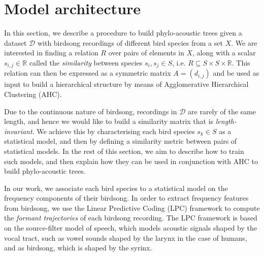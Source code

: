 \documentclass[pdftex,11pt,a4paper]{article}
\theoremstyle{definition}
\theoremstyle{remark}
\begin{document}
\section{Model architecture}
\label{section_model}
In this section, we describe a procedure to build phylo-acoustic trees given a dataset $\mathcal{D}$ with birdsong recordings of different bird species from a set $X$. We are interested in finding a relation $R$ over pairs of elements in $X$, along with a scalar $s_{i, j} \in \mathbb{R}$ called the \emph{similarity} between species $s_i, s_j \in S$, i.e. $R \subseteq S \times S \times \mathbb{R}$. This relation can then be expressed as a symmetric matrix $A = (d_{i,j})$ and be used as input to build a hierarchical structure by means of Agglomerative Hierarchical Clustering (AHC). 
\par Due to the continuous nature of birdsong, recordings in $\mathcal{D}$ are rarely of the same length, and hence we would like to build a similarity matrix that is \emph{length-invariant}. We achieve this by characterising each bird species $s_k \in S$ as a statistical model, and then by defining a similarity metric between pairs of statistical models. In the rest of this section, we aim to describe how to train such models, and then explain how they can be used in conjunction with AHC to build phylo-acoustic trees.
\par In our work, we associate each bird species to a statistical model on the frequency components of their birdsong. In order to extract frequency features from birdsong, we use the Linear Predictive Coding (LPC) framework to compute the \emph{formant trajectories} of each birdsong recording. The LPC framework is based on the source-filter model of speech, which models acoustic signals shaped by the vocal tract, such as vowel sounds shaped by the larynx in the case of humans, and as birdsong, which is shaped by the syrinx.
\end{document}
